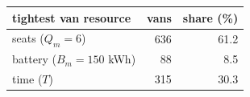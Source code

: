 \begin{tabular}{@{}lrr@{}}
\toprule
tightest van resource & vans & share (\%) \\
\midrule
seats ($Q_m=6$) & 636 & 61.2 \\
battery ($B_m=150$ kWh) & 88 & 8.5 \\
time ($T$) & 315 & 30.3 \\
\bottomrule
\end{tabular}
